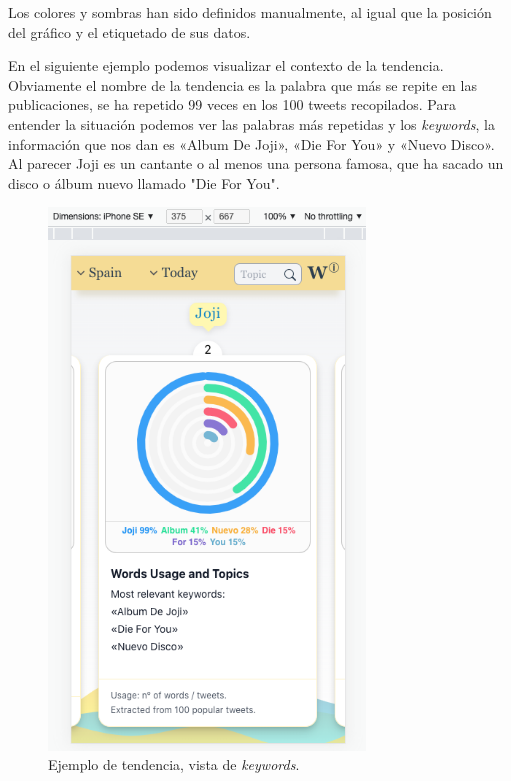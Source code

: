 Los colores y sombras han sido definidos manualmente, al igual que la posición del gráfico y el etiquetado de sus datos.

\vspace{0.3cm}

En el siguiente ejemplo podemos visualizar el contexto de la tendencia. Obviamente el nombre de la tendencia es la palabra que más se repite en las publicaciones, se ha repetido 99 veces en los 100 tweets recopilados. Para entender la situación podemos ver las palabras más repetidas y los \textit{keywords}, la información que nos dan es «Album De Joji», «Die For You» y «Nuevo Disco». Al parecer Joji es un cantante o al menos una persona famosa, que ha sacado un disco o álbum nuevo llamado "Die For You".

\begin{figure}[H]
    \centering
    \myfloatalign
    \includegraphics[width=0.75\textwidth]{gfx/ejemplo3.png}
    \caption[Ejemplo de tendencia, vista de \textit{keywords}]{Ejemplo de tendencia, vista de \textit{keywords}.}\label{gfx:ejemplo3}
\end{figure}

